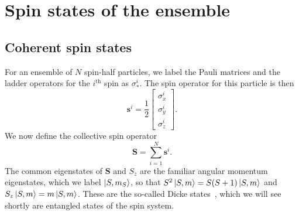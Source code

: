 %


\section{Spin states of the ensemble}


\subsection{Coherent spin states}

For an ensemble of $N$ spin-half particles, we label the Pauli matrices and the
ladder operators for the $i^\text{th}$ spin as $\sigma_*^i$. The spin operator
for this particle is then
%
\begin{equation}
  \mathbf{s}^i = \frac{1}{2}\begin{bmatrix} \sigma^i_x \\ \sigma^i_y \\ \sigma^i_z
\end{bmatrix}.
\end{equation}
%
We now define the collective spin operator
%
\begin{equation}
  \mathbf{S} = \sum_{i=1}^N \mathbf{s}^i.
\end{equation}
%
The common eigenstates of $\mathbf{S}$ and $S_z$ are the familiar angular
momentum eigenstates, which we label $\ket{S,m_S}$, so that $S^2 \ket{S,m} =
S(S+1)\ket{S, m}$ and $S_z \ket{S,m} = m\ket{S, m}$. These are the so-called
Dicke states~\cite{}, which we will see shortly are entangled states of the
spin system.

